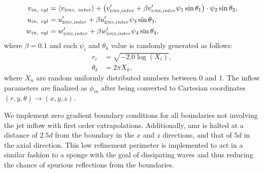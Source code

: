 \begin{subequations} \label{Jet_Inflow_noise}
	\begin{align}
		v_{in,\ cyl} &= \langle v_{\text{\tiny{DNS}},\ inter} \rangle + \big(  v^{\prime}_{\text{\tiny{DNS}}, inter}  + \beta  v^{\prime}_{\text{\tiny{DNS}}, inter}    	\psi_1\sin{\theta_1}  \big) \cdot \psi_2 \sin{\theta_2}, \label{y_flow} \\
		u_{in,\ cyl} &=   u^{\prime}_{\text{\tiny{DNS}}, inter}  + \beta  u^{\prime}_{\text{\tiny{DNS}}, inter}  \psi_3\sin{\theta_3}, \label{t_flow} \\
		w_{in,\ cyl} &=   w^{\prime}_{\text{\tiny{DNS}}, inter}  + \beta  w^{\prime}_{\text{\tiny{DNS}}, inter}  \psi_4\sin{\theta_4},  \label{theta_flow}
	\end{align}
\end{subequations}  
where $\beta = 0.1$ and each $\psi_i$ and $\theta_k$ value is randomly generated as follows:
\begin{subequations} \label{Random_Variables}
	\begin{align}
		r_i &= \sqrt{-2.0 \log{(X_i)}} \label{Random_r}, \\
		\theta_k &= 2 \pi X_k \label{Radom_theta},
	\end{align}
\end{subequations}
where $X_n$ are random uniformly distributed numbers between 0 and 1. The inflow parameters are finalized as $\phi_{in}$ after being converted to Cartesian coordinates $(r,y,\theta) \to (x,y,z)$. 

We implement zero gradient boundary conditions for all boundaries not involving the jet inflow with first order extrapolations. Additionally, \gls{amr} is halted at a distance of $2.5d$ from the boundary in the $x$ and $z$ directions, and that of $5d$ in the axial direction. This low refinement perimeter is implemented to act in a similar fashion to a sponge with the goal of dissipating waves and thus reducing the chance of spurious reflections from the boundaries.

